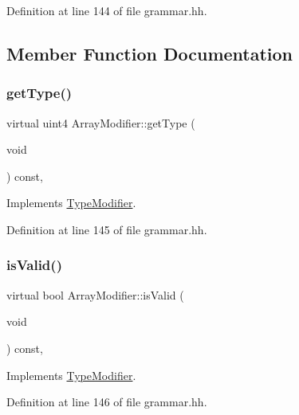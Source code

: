 Definition at line 144 of file grammar.\+hh.



\subsection{Member Function Documentation}
\mbox{\label{class_array_modifier_afdececd05d0f382f08e4c5502d8ba17c}} 
\subsubsection{\texorpdfstring{getType()}{getType()}}
{\footnotesize\ttfamily virtual uint4 Array\+Modifier\+::get\+Type (\begin{DoxyParamCaption}\item[{void}]{ }\end{DoxyParamCaption}) const\hspace{0.3cm}{\ttfamily [inline]}, {\ttfamily [virtual]}}



Implements \mbox{\hyperlink{class_type_modifier_aac3cedefacdceace7669f57b9bd42df6}{Type\+Modifier}}.



Definition at line 145 of file grammar.\+hh.

\mbox{\label{class_array_modifier_ac9ad18fe0ecb33f70808ba1ca8acd574}} 
\subsubsection{\texorpdfstring{isValid()}{isValid()}}
{\footnotesize\ttfamily virtual bool Array\+Modifier\+::is\+Valid (\begin{DoxyParamCaption}\item[{void}]{ }\end{DoxyParamCaption}) const\hspace{0.3cm}{\ttfamily [inline]}, {\ttfamily [virtual]}}



Implements \mbox{\hyperlink{class_type_modifier_a67477f048c4ede6b0a0419bf399f2113}{Type\+Modifier}}.



Definition at line 146 of file grammar.\+hh.

